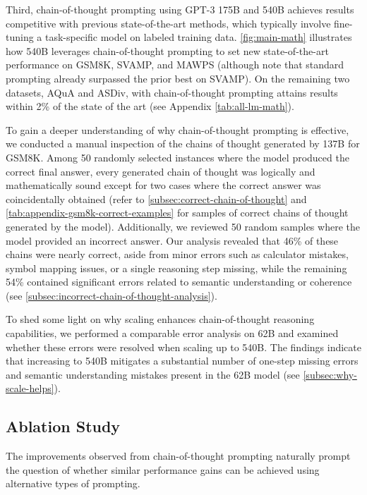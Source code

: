 Third, chain-of-thought prompting using GPT-3 175B and \palm{} 540B achieves results competitive with previous state-of-the-art methods, which typically involve fine-tuning a task-specific model on labeled training data. 
\cref{fig:main-math} illustrates how \palm{} 540B leverages chain-of-thought prompting to set new state-of-the-art performance on GSM8K, SVAMP, and MAWPS (although note that standard prompting already surpassed the prior best on SVAMP). On the remaining two datasets, AQuA and ASDiv, \palm{} with chain-of-thought prompting attains results within 2\% of the state of the art (see Appendix \cref{tab:all-lm-math}).

To gain a deeper understanding of why chain-of-thought prompting is effective, we conducted a manual inspection of the chains of thought generated by \lamda{} 137B for GSM8K. Among 50 randomly selected instances where the model produced the correct final answer, every generated chain of thought was logically and mathematically sound except for two cases where the correct answer was coincidentally obtained (refer to \cref{subsec:correct-chain-of-thought} and \cref{tab:appendix-gsm8k-correct-examples} for samples of correct chains of thought generated by the model). Additionally, we reviewed 50 random samples where the model provided an incorrect answer. Our analysis revealed that 46\% of these chains were nearly correct, aside from minor errors such as calculator mistakes, symbol mapping issues, or a single reasoning step missing, while the remaining 54\% contained significant errors related to semantic understanding or coherence (see \cref{subsec:incorrect-chain-of-thought-analysis}). 

To shed some light on why scaling enhances chain-of-thought reasoning capabilities, we performed a comparable error analysis on \palm{} 62B and examined whether these errors were resolved when scaling up to \palm{} 540B. The findings indicate that increasing \palm{} to 540B mitigates a substantial number of one-step missing errors and semantic understanding mistakes present in the 62B model (see \cref{subsec:why-scale-helps}).

\subsection{Ablation Study}\label{subsec:math-ablation}

The improvements observed from chain-of-thought prompting naturally prompt the question of whether similar performance gains can be achieved using alternative types of prompting. 

